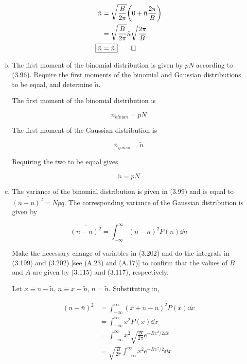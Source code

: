 \documentclass[9pt,a4paper,twocolumn]{article}
\begin{document}
\begin{enumerate}[(a)]
\begin{align}
	\bar{n} &= \sqrt{\frac{B}{2\pi}}\qty(0 + \tilde{n}\frac{2\pi}{B}) \\
	&= \sqrt{\frac{B}{2\pi}}\tilde{n}\sqrt{\frac{2\pi}{B}} \\
	\Aboxed{
		\bar{n} &= \tilde{n}
	} \qed
\end{align}

\item The first moment of the binomial distribution is given by $pN$ according to (3.96). Require the first moments of the binomial and Gaussian distributions to be equal, and determine $\tilde{n}$.

The first moment of the binomial distribution is

\begin{equation}
	\bar{n}_{binom} = pN
\end{equation}

The first moment of the Gaussian distribution is

\begin{equation}
	\bar{n}_{gauss} = \tilde{n}
\end{equation}

Requiring the two to be equal gives

\begin{equation}
	\boxed{
		\tilde{n} = pN
	}
\end{equation}

\item The variance of the binomial distribution is given in (3.99) and is equal to $\overline{(n - \bar{n})^2} = Npq$. The corresponding variance of the Gaussian distribution is given by

\begin{equation}
	\overline{(n - \bar{n})^2} = \int_{-\infty}^\infty (n - \bar{n})^2 P(n) \dd{n}
\end{equation}

Make the necessary change of variables in (3.202) and do the integrals in (3.199) and (3.202) [see (A.23) and (A.17)] to confirm that the values of $B$ and $A$ are given by (3.115) and (3.117), respectively.

Let $x \equiv n - \tilde{n}$, $n \equiv x+\tilde{n}$, $\bar{n} = \tilde{n}$. Substituting in,

\begin{align}
	\overline{(n - \bar{n})^2} &= \int_{-\infty}^\infty (x+\tilde{n}-\tilde{n})^2 P(x)\dd{x} \\
	&= \int_{-\infty}^\infty x^2 P(x)\dd{x} \\
	&= \int_{-\infty}^\infty x^2 \sqrt{\frac{B}{2\pi}}e^{-Bx^2/2\dd{x}} \\
	&= \sqrt{\frac{B}{2\pi}} \int_{-\infty}^\infty x^2 e^{-Bx^2/2}\dd{x}
\end{align}


\end{enumerate}
\end{document}
